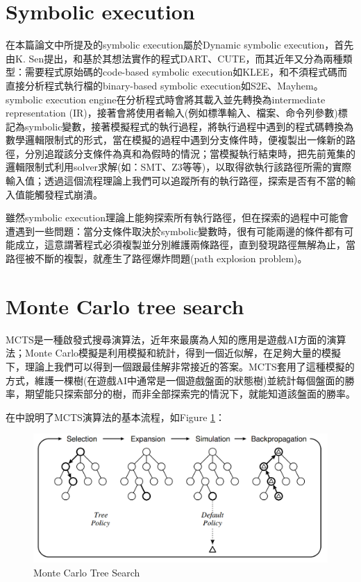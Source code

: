 \documentclass[12pt,a4paper,oneside]{book}
\begin{document}
\section{Symbolic execution}

在本篇論文中所提及的symbolic execution屬於Dynamic symbolic execution，首先由K. Sen\cite{sen2007concolic}提出，和基於其想法實作的程式DART\cite{godefroid2005dart}、CUTE\cite{sen2005cute}，而其近年又分為兩種類型：需要程式原始碼的code-based symbolic execution如KLEE\cite{cadar2008klee}，和不須程式碼而直接分析程式執行檔的binary-based symbolic execution如S2E\cite{chipounov2012s2e}、Mayhem\cite{cha2012mayhem}。symbolic execution engine在分析程式時會將其載入並先轉換為intermediate representation (IR)，接著會將使用者輸入(例如標準輸入、檔案、命令列參數)標記為symbolic變數，接著模擬程式的執行過程，將執行過程中遇到的程式碼轉換為數學邏輯限制式的形式，當在模擬的過程中遇到分支條件時，便複製出一條新的路徑，分別追蹤該分支條件為真和為假時的情況；當模擬執行結束時，把先前蒐集的邏輯限制式利用solver求解(如：SMT\cite{vanegue2012smt}、Z3\cite{Z3}等等)，以取得欲執行該路徑所需的實際輸入值；透過這個流程理論上我們可以追蹤所有的執行路徑，探索是否有不當的輸入值能觸發程式崩潰。

雖然symbolic execution理論上能夠探索所有執行路徑，但在探索的過程中可能會遭遇到一些問題：當分支條件取決於symbolic變數時，很有可能兩邊的條件都有可能成立，這意謂著程式必須複製並分別維護兩條路徑，直到發現路徑無解為止，當路徑被不斷的複製，就產生了路徑爆炸問題(path explosion problem)。

\section{Monte Carlo tree search}

MCTS是一種啟發式搜尋演算法，近年來最廣為人知的應用是遊戲AI方面的演算法；Monte Carlo模擬是利用模擬和統計，得到一個近似解，在足夠大量的模擬下，理論上我們可以得到一個跟最佳解非常接近的答案。MCTS套用了這種模擬的方式，維護一棵樹(在遊戲AI中通常是一個遊戲盤面的狀態樹)並統計每個盤面的勝率，期望能只探索部分的樹，而非全部探索完的情況下，就能知道該盤面的勝率。

在\cite{browne2012surveyMCTS}中說明了MCTS演算法的基本流程，如Figure \ref{figMCTS}：

\begin{figure}[h]
\center
\includegraphics[width=\textwidth,height=\textheight,keepaspectratio]{figures/mcts2.PNG}
\caption{Monte Carlo Tree Search \label{figMCTS}}
\end{figure}
\end{document}
